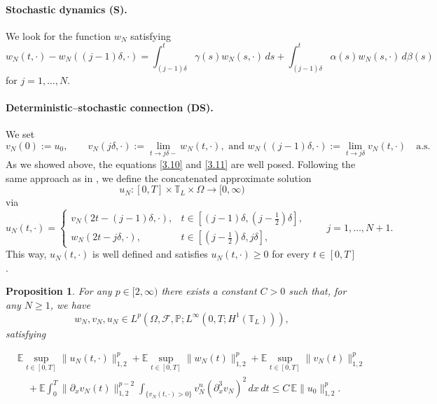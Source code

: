 \documentclass[a4paper,12pt]{article}
\newtheorem{proposition}[definition]{Proposition}
\numberwithin{equation}{section}
\def\d{\partial}
\begin{document}
\medskip

\paragraph{Stochastic dynamics (S).}
We look for the function $w_N$ satisfying
\begin{equation}
\label{3.11}
w_N(t,\cdot) - w_N((j-1)\delta,\cdot)
=
\int_{(j-1)\delta}^{t} \gamma(s) w_N(s,\cdot)\,ds
+
\int_{(j-1)\delta}^{t} \alpha(s) w_N(s,\cdot)\,d\beta(s)
\end{equation}
for $j=1,\dots,N$.
\medskip

\paragraph{Deterministic--stochastic connection (DS).}
We set
\begin{equation}
\label{3.12}
v_N(0):=u_0,
\qquad
v_N(j\delta, \cdot):=\lim_{t\to j\delta-} w_N(t, \cdot),
 \text{  and  }
w_N((j-1)\delta, \cdot):=\lim_{t\to j\delta} v_N(t, \cdot)
\quad \text{a.s.}
\end{equation}
As we showed above, the equations \eqref{3.10} and \eqref{3.11} are well posed. Following the same approach as in \cite{Gess1}, we define the concatenated approximate solution
\[
u_N : [0,T]\times\mathbb{T}_L \times\Omega \to [0,\infty)
\]
via
\begin{equation*}
\label{eq:approx-solution}
u_N(t,\cdot)
=
\begin{cases}
v_N(2t-(j-1)\delta,\cdot),
& t \in [(j-1)\delta,(j-\tfrac12)\delta], \\[0.5em]
w_N(2t-j\delta,\cdot),
& t \in [(j-\tfrac12)\delta,j\delta],
\end{cases}
\qquad j=1,\dots,N+1.
\end{equation*}
This way, $u_N(t,\cdot)$ is well defined and satisfies
$u_N(t,\cdot)\ge0$ for every $t\in[0,T]$.

\medskip

\begin{proposition}
\label{prop:3.5}
For any $p\in[2,\infty)$ there exists a constant $C>0$ such that,
for any $N\ge1$, we have
\[
w_N, v_N, u_N \in L^p\!\left(
\Omega,\mathcal{F},\mathbb{P};
L^\infty(0,T;H^1(\mathbb{T}_L))
\right),
\]
satisfying


\begin{align}
\label{3.13}
& \mathbb{E} \sup_{t \in [0,T]} \|u_N(t,\cdot)\|_{1,2}^p
 + \mathbb{E} \sup_{t \in [0,T]} \|w_N(t)\|_{1,2}^p
 + \mathbb{E} \sup_{t \in [0,T]} \|v_N(t)\|_{1,2}^p \nonumber \\
& \quad
 + \mathbb{E} \int_0^T \|\partial_x v_N(t)\|_{1,2}^{p-2} \int_{\{v_N(t, \cdot)>0\}} v_N^n (\d_x^3 v_N)^2 \, dx \, dt 
 \le C \, \mathbb{E} \|u_0\|_{1,2}^p .
\end{align}
\end{proposition}
\medskip
\end{document}
